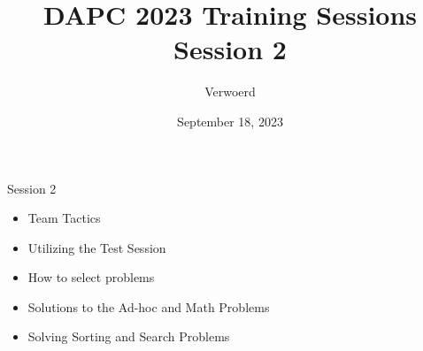 \documentclass[11pt,pdf, aspectratio=169]{beamer}
\title{DAPC 2023 Training Sessions\\Session 2}
\date{September 18, 2023}
\author{Verwoerd}
\begin{document}
  \maketitle
  \begin{frame}{Session 2}
    \begin{itemize}
      \item Team Tactics
      \item Utilizing the Test Session
      \item How to select problems
      \item Solutions to the Ad-hoc and Math Problems
      \item Solving Sorting and Search Problems
    \end{itemize}
    \doclicenseThis
  \end{frame}
\end{document}
